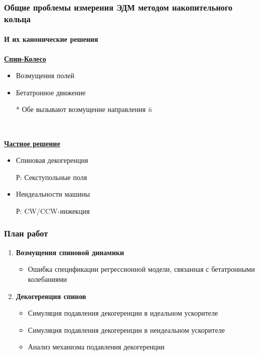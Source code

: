 \documentclass[14pt]{beamer}
\begin{document}
\begin{frame}\frametitle{Общие проблемы измерения ЭДМ методом накопительного кольца}\framesubtitle{И их канонические решения}
\begin{minipage}[t]{.5\linewidth}
	\underline{\textbf{Спин-Колесо}}
	\begin{itemize}
		\item Возмущения полей
		\item Бетатронное движение
		\item[*] Обе вызывают возмущение направления $\bar n$
	\end{itemize}
\end{minipage}~%
\begin{minipage}[t]{.5\linewidth}
	\underline{\textbf{Частное решение}}
	\begin{itemize}
		\item Спиновая декогеренция
		\item[Р:] Секступольные поля
		\item Неидеальности машины
		\item[Р:] CW/CCW-инжекция
	\end{itemize}
\end{minipage}
\end{frame}
\begin{frame}
\frametitle{План работ}
\begin{enumerate}[<+->]
  \item \textbf{Возмущения спиновой динамики}
  \begin{itemize}
  	\item Ошибка спецификации регрессионной модели, связанная с бетатронными колебаниями
  \end{itemize}
  \item \textbf{Декогеренция спинов}
  \begin{itemize}
    \item Симуляция подавления декогеренции в идеальном ускорителе
    \item Симуляция подавления декогеренции в неидеальном ускорителе
    \item Анализ механизма подавления декогеренции
  \end{itemize}
\end{enumerate}
\end{frame}
\end{document}
